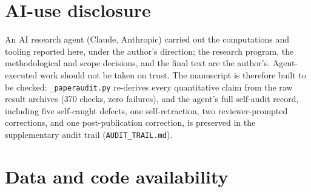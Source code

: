 \documentclass[11pt]{article}
\begin{document}
\section*{AI-use disclosure}

An AI research agent (Claude, Anthropic) carried out the computations and tooling reported here, under the author's direction; the research program, the methodological and scope decisions, and the final text are the author's. Agent-executed work should not be taken on trust. The manuscript is therefore built to be checked: \texttt{\_paperaudit.py} re-derives every quantitative claim from the raw result archives (370 checks, zero failures), and the agent's full self-audit record, including five self-caught defects, one self-retraction, two reviewer-prompted corrections, and one post-publication correction, is preserved in the supplementary audit trail (\texttt{AUDIT\_TRAIL.md}).

\section*{Data and code availability}
\end{document}
